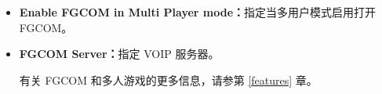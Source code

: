 \begin{itemize}
\item \textbf{Enable FGCOM in Multi Player mode：}指定当多用户模式启用打开 FGCOM。
\item \textbf{FGCOM Server：}指定 VOIP 服务器。

有关 FGCOM 和多人游戏的更多信息，请参第 \ref{features} 章。
\fi
%
%
%


\end{itemize}
